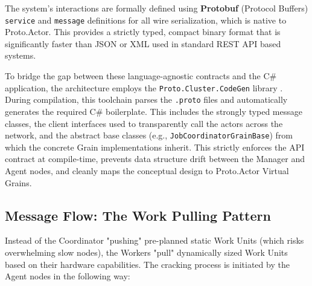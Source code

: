 The system's interactions are formally defined using \textbf{Protobuf} (Protocol Buffers) \verb|service| and \verb|message| definitions \cite{about_proto_cluster} for all wire serialization, which is native to Proto.Actor. This provides a strictly typed, compact binary format that is significantly faster than JSON or XML used in standard REST API based systems.

To bridge the gap between these language-agnostic contracts and the C\# application, the architecture employs the \verb|Proto.Cluster.CodeGen| library \cite{proto_codegen}. During compilation, this toolchain parses the \verb|.proto| files and automatically generates the required C\# boilerplate. This includes the strongly typed message classes, the client interfaces used to transparently call the actors across the network, and the abstract base classes (e.g., \verb|JobCoordinatorGrainBase|) from which the concrete Grain implementations inherit. This strictly enforces the API contract at compile-time, prevents data structure drift between the Manager and Agent nodes, and cleanly maps the conceptual design to Proto.Actor Virtual Grains.

\subsection{Message Flow: The Work Pulling Pattern}

Instead of the Coordinator "pushing" pre-planned static Work Units (which risks overwhelming slow nodes), the Workers "pull" dynamically sized Work Units based on their hardware capabilities. The cracking process is initiated by the Agent nodes in the following way:

